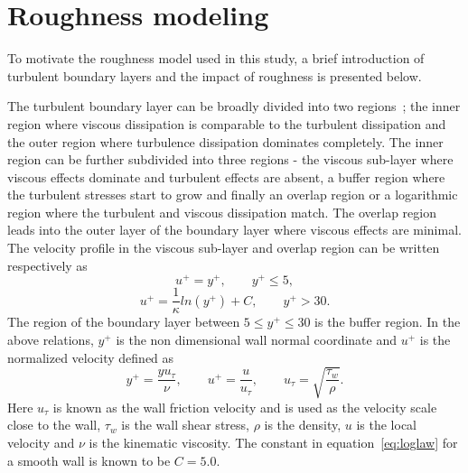 \section{Roughness modeling}\label{sec:roughness}
To motivate the roughness model used in this study, a brief introduction of turbulent boundary layers and the impact of roughness is presented below.

The turbulent boundary layer can be broadly divided into two regions~\cite{Pope2000,schlichting2016boundary}; the inner region where viscous dissipation is comparable to the turbulent dissipation and the outer region where turbulence dissipation dominates completely. The inner region can be further subdivided into three regions - the viscous sub-layer where viscous effects dominate and turbulent effects are absent, a buffer region where the turbulent stresses start to grow and finally an overlap region or a logarithmic region where the turbulent and viscous dissipation match. The overlap region leads into the outer layer of the boundary layer where viscous effects are minimal. The velocity profile in the viscous sub-layer and overlap region can be written respectively as
\begin{equation}
    u^+ = y^+, \qquad y^+ \leq 5,
    \label{eq:visclaw}
\end{equation}{}
\begin{equation}
    u^+ = \frac{1}{\kappa}ln(y^+) + C, \qquad y^+ > 30.
    \label{eq:loglaw}
\end{equation}{}
The region of the boundary layer between $5 \leq y^+ \leq 30$ is the buffer region. In the above relations, $y^+$ is the non dimensional wall normal coordinate and $u^+$ is the normalized velocity defined as
\begin{equation*}{}
y^+ = \frac{y u_{\tau}}{\nu}, \qquad u^+ = \frac{u}{u_{\tau}}, \qquad  u_{\tau} = \sqrt{\frac{\tau_w}{\rho}}.
\end{equation*}
Here $u_{\tau}$ is known as the wall friction velocity and is used as the velocity scale close to the wall, $\tau_w$ is the wall shear stress, $\rho$ is the density, $u$ is the local velocity and $\nu$ is the kinematic viscosity. The constant in equation~\ref{eq:loglaw} for a smooth wall is known to be $C=5.0$.

